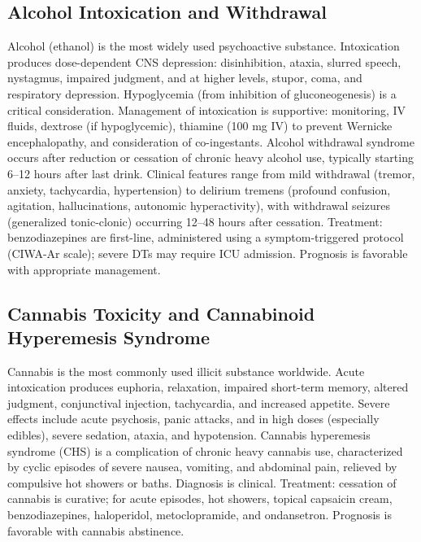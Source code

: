 \subsection{Alcohol Intoxication and Withdrawal}
\label{sec:Alcohol Intoxication and Withdrawal}
Alcohol (ethanol) is the most widely used psychoactive substance. Intoxication produces dose-dependent CNS depression: disinhibition, ataxia, slurred speech, nystagmus, impaired judgment, and at higher levels, stupor, coma, and respiratory depression. Hypoglycemia (from inhibition of gluconeogenesis) is a critical consideration. Management of intoxication is supportive: monitoring, IV fluids, dextrose (if hypoglycemic), thiamine (100 mg IV) to prevent Wernicke encephalopathy, and consideration of co-ingestants. Alcohol withdrawal syndrome occurs after reduction or cessation of chronic heavy alcohol use, typically starting 6--12 hours after last drink. Clinical features range from mild withdrawal (tremor, anxiety, tachycardia, hypertension) to delirium tremens (profound confusion, agitation, hallucinations, autonomic hyperactivity), with withdrawal seizures (generalized tonic-clonic) occurring 12--48 hours after cessation. Treatment: benzodiazepines are first-line, administered using a symptom-triggered protocol (CIWA-Ar scale); severe DTs may require ICU admission. Prognosis is favorable with appropriate management.

\subsection{Cannabis Toxicity and Cannabinoid Hyperemesis Syndrome}
\label{sec:Cannabis Toxicity}
Cannabis is the most commonly used illicit substance worldwide. Acute intoxication produces euphoria, relaxation, impaired short-term memory, altered judgment, conjunctival injection, tachycardia, and increased appetite. Severe effects include acute psychosis, panic attacks, and in high doses (especially edibles), severe sedation, ataxia, and hypotension. Cannabis hyperemesis syndrome (CHS) is a complication of chronic heavy cannabis use, characterized by cyclic episodes of severe nausea, vomiting, and abdominal pain, relieved by compulsive hot showers or baths. Diagnosis is clinical. Treatment: cessation of cannabis is curative; for acute episodes, hot showers, topical capsaicin cream, benzodiazepines, haloperidol, metoclopramide, and ondansetron. Prognosis is favorable with cannabis abstinence.

